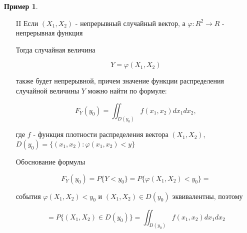 \documentclass[a4paper, 14pt]{report}
\newtheorem{example}{Пример}[section]
\begin{document}
\begin{example}
\end{example}

\begin{enumerate}
    \item[II] Если $(X_1, X_2)$ - непрерывный случайный вектор, а $\varphi : R^2 \to R$ - непрерывная функция

        Тогда случайная величина 

        $$
        Y=\varphi(X_1, X_2)
        $$

        также будет непрерывной, причем значение функции распределения случайной величины $Y$ можно найти по формуле:

        $$
        F_Y(y_0) = \iint_{D(y_0)} f(x_1,x_2) dx_1dx_2,
        $$

        где $f$ - функция плотности распределения вектора $(X_1, X_2)$, $D(y_0) = \{(x_1, x_2) : \varphi(x_1,x_2) < y\}$

        Обоснование формулы

        $$
        F_Y(y_0) = P\{Y<y_0\} = P\{\varphi(X_1, X_2) < y_0\} =
        $$

        события $\varphi(X_1,X_2) < y_0$ и $(X_1,X_2) \in D(y_0)$ эквивалентны, поэтому

        $$
        = P \{ (X_1,X_2) \in D(y_0)\} = \iint_{D(y_0)} f(x_1, x_2) dx_1dx_2
        $$
\end{enumerate}
\end{document}
